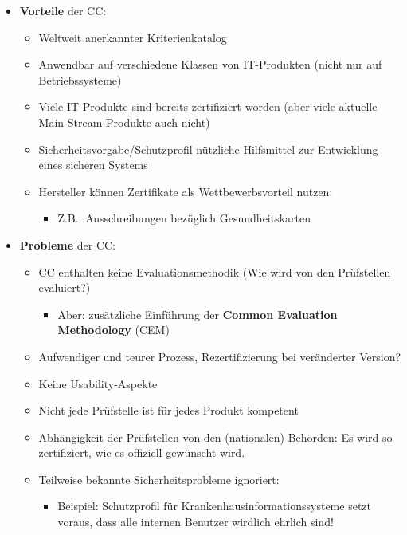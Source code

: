 \documentclass[openany]{book}
\begin{document}
\begin{itemize}
    \item \textbf{Vorteile} der CC:
    \begin{itemize}
        \item Weltweit anerkannter Kriterienkatalog
        \item Anwendbar auf verschiedene Klassen von IT-Produkten (nicht nur auf Betriebssysteme)
        \item Viele IT-Produkte sind bereits zertifiziert worden (aber viele aktuelle Main-Stream-Produkte auch nicht)
        \item Sicherheitsvorgabe/Schutzprofil nützliche Hilfsmittel zur Entwicklung eines sicheren Systems
        \item Hersteller können Zertifikate als Wettbewerbsvorteil nutzen:
        \begin{itemize}
            \item Z.B.: Ausschreibungen bezüglich Gesundheitskarten
        \end{itemize}
    \end{itemize}
    \item \textbf{Probleme} der CC:
    \begin{itemize}
        \item CC enthalten keine Evaluationsmethodik (Wie wird von den Prüfstellen evaluiert?)
        \begin{itemize}
            \item Aber: zusätzliche Einführung der \textbf{Common Evaluation Methodology} (CEM)
        \end{itemize}
        \item Aufwendiger und teurer Prozess, Rezertifizierung bei veränderter Version?
        \item Keine Usability-Aspekte
        \item Nicht jede Prüfstelle ist für jedes Produkt kompetent
        \item Abhängigkeit der Prüfstellen von den (nationalen) Behörden: Es wird so zertifiziert, wie es offiziell gewünscht wird.
        \item Teilweise bekannte Sicherheitsprobleme ignoriert:
        \begin{itemize}
            \item Beispiel: Schutzprofil für Krankenhausinformationssysteme setzt voraus, dass alle internen Benutzer wirdlich ehrlich sind!
        \end{itemize}
    \end{itemize}
\end{itemize}
\end{document}
